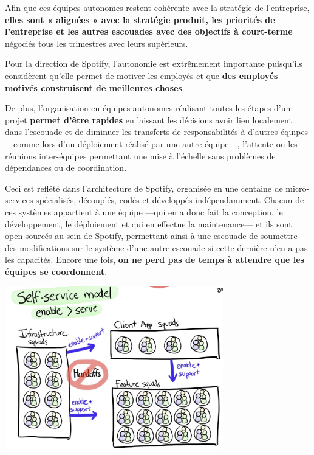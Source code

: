 Afin que ces équipes autonomes restent cohérente avec la stratégie de l'entreprise, \textbf{elles sont « alignées » avec la stratégie produit, les priorités de l’entreprise et les autres escouades avec des objectifs à court-terme} négociés tous les trimestres avec leurs supérieurs.

\vspace{5mm}

Pour la direction de Spotify, l'autonomie est extrêmement importante puisqu'ils considèrent qu'elle permet de motiver les employés et que \textbf{des employés motivés construisent de meilleures choses}.

De plus, l'organisation en équipes autonomes réalisant toutes les étapes d'un projet \textbf{permet d'être rapides} en laissant les décisions avoir lieu localement dans l'escouade et de diminuer les transferts de responsabilités à d’autres équipes ---comme lors d'un déploiement réalisé par une autre équipe---, l’attente ou les réunions inter-équipes permettant une mise à l’échelle sans problèmes de dépendances ou de coordination.

Ceci est reflété dans l'architecture de Spotify, organisée en une centaine de micro-services spécialisés, découplés, codés et développés indépendamment. Chacun de ces systèmes appartient à une équipe ---qui en a donc fait la conception, le développement, le déploiement et qui en effectue la maintenance--- et ils sont open-sourcés au sein de Spotify, permettant ainsi à une escouade de soumettre des modifications sur le système d’une autre escouade si cette dernière n’en a pas les capacités. Encore une fois, \textbf{on ne perd pas de temps à attendre que les équipes se coordonnent}.

\newpage

\begin{center}
\includegraphics[width=95mm]{./images_spotify/image03}
\end{center}

